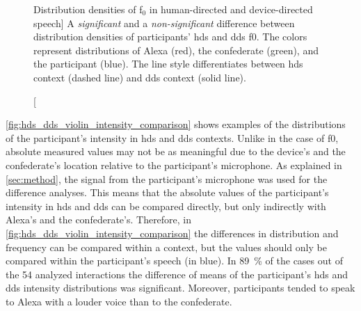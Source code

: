\begin{figure}[t]
	\centering
	\hfill %
	\caption
	[Distribution densities of f$_0$ in human-directed and device-directed speech]
	{A \emph{significant}  and a \emph{non-significant}  difference between distribution densities of participants' \ac{hds} and \ac{dds} \ac{f0}.
		The colors represent distributions of Alexa (red), the confederate (green), and the participant (blue).
		The line style differentiates between \ac{hds} context (dashed line) and \ac{dds} context (solid line).}
	\label{fig:hds_dds_dist_pitch_comparison}
\end{figure}

\cref{fig:hds_dds_violin_intensity_comparison} shows examples of the distributions of the participant's intensity in \ac{hds} and \ac{dds} contexts.
Unlike in the case of \ac{f0}, absolute measured values may not be as meaningful due to the device's and the confederate's location relative to the participant's microphone.
As explained in \cref{sec:method}, the signal from the participant's microphone was used for the difference analyses.
This means that the absolute values of the participant's intensity  in \ac{hds} and \ac{dds} can be compared directly, but only indirectly with Alexa's and the confederate's.
Therefore, in \cref{fig:hds_dds_violin_intensity_comparison} the differences in distribution and frequency can be compared within a context, but the values should only be compared within the participant's speech (in blue).
In \SI{89}{\percent} of the cases out of the 54 analyzed interactions the difference of means of the participant's \ac{hds} and \ac{dds} intensity distributions was significant.
Moreover, participants tended to speak to Alexa with a louder voice than to the confederate.

